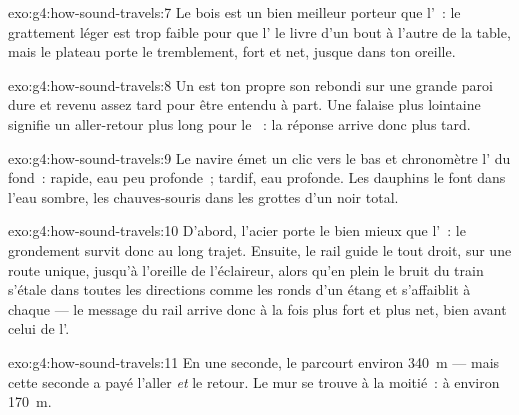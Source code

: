 \begin{solution}{exo:g4:how-sound-travels:7}
Le bois est un bien meilleur porteur que l'~: le grattement léger
est trop faible pour que l' le livre d'un bout à l'autre de la
table, mais le plateau  porte le tremblement, fort et net,
jusque dans ton oreille.
\end{solution}

\begin{solution}{exo:g4:how-sound-travels:8}
Un  est ton propre son rebondi sur une grande paroi dure et
revenu assez tard pour être entendu à part. Une falaise plus
lointaine signifie un aller-retour plus long pour le ~: la réponse
arrive donc plus tard.
\end{solution}

\begin{solution}{exo:g4:how-sound-travels:9}
Le navire émet un clic vers le bas et chronomètre l' du fond~:
 rapide, eau peu profonde~;  tardif, eau profonde. Les
dauphins le font dans l'eau sombre, les chauves-souris dans les
grottes d'un noir total.
\end{solution}

\begin{solution}{exo:g4:how-sound-travels:10}
D'abord, l'acier porte le  bien mieux que l'~: le grondement
survit donc au long trajet. Ensuite, le rail guide le  tout droit,
sur une route unique, jusqu'à l'oreille de l'éclaireur, alors qu'en
plein  le bruit du train s'étale dans toutes les directions comme
les ronds d'un étang et s'affaiblit à chaque  --- le message du
rail arrive donc à la fois plus fort et plus net, bien avant celui de
l'.
\end{solution}

\begin{solution}{exo:g4:how-sound-travels:11}
En une seconde, le  parcourt environ \qty{340}{m} --- mais cette
seconde a payé l'aller \emph{et} le retour. Le mur se trouve à la
moitié~: à environ \qty{170}{m}.
\end{solution}

